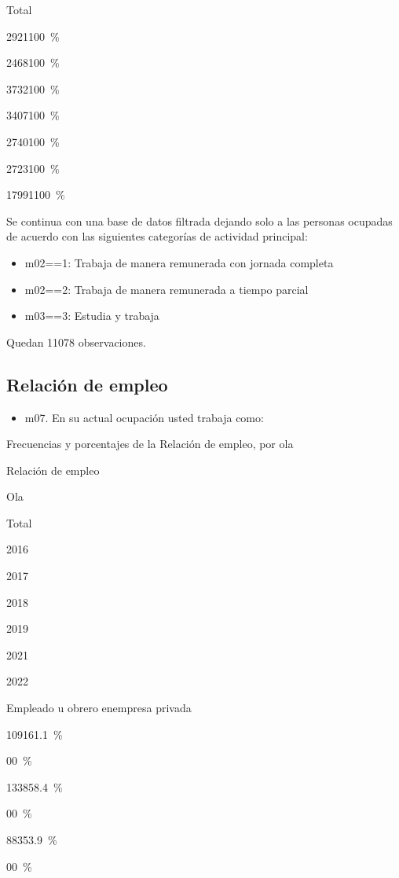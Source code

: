 \documentclass[
  12pt,
]{book}
\providecommand{\tightlist}{%
  \setlength{\itemsep}{0pt}\setlength{\parskip}{0pt}}
\begin{document}
Total

{2921}{100~\%}

{2468}{100~\%}

{3732}{100~\%}

{3407}{100~\%}

{2740}{100~\%}

{2723}{100~\%}

{17991}{100~\%}

Se continua con una base de datos filtrada dejando solo a las personas ocupadas de acuerdo con las siguientes categorías de actividad principal:

\begin{itemize}
\tightlist
\item
  m02==1: Trabaja de manera remunerada con jornada completa
\item
  m02==2: Trabaja de manera remunerada a tiempo parcial
\item
  m03==3: Estudia y trabaja
\end{itemize}

Quedan 11078 observaciones.

\hypertarget{relaciuxf3n-de-empleo}{%
\subsection{Relación de empleo}\label{relaciuxf3n-de-empleo}}

\begin{itemize}
\tightlist
\item
  m07. En su actual ocupación usted trabaja como:
\end{itemize}

Frecuencias y porcentajes de la Relación de empleo, por ola

Relación de empleo

Ola

Total

2016

2017

2018

2019

2021

2022

Empleado u obrero enempresa privada

{1091}{61.1~\%}

{0}{0~\%}

{1338}{58.4~\%}

{0}{0~\%}

{883}{53.9~\%}

{0}{0~\%}
\end{document}
